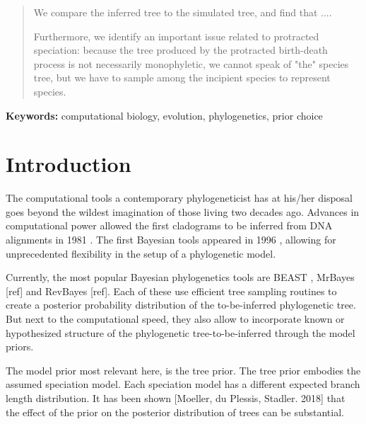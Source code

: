 \documentclass{article}
\begin{document}
\begin{abstract}
  We compare the inferred tree to the simulated tree, and find that ....

  Furthermore, we identify an important issue related to protracted speciation:
  because the tree produced by the protracted birth-death process 
  is not necessarily monophyletic, we cannot speak of "the" species tree, but we
  have to sample among the incipient species to represent species. 



\end{abstract}

{\bf Keywords:} computational biology, evolution, phylogenetics, prior choice

\section{Introduction}

The computational tools a contemporary phylogeneticist has at his/her disposal
goes beyond the wildest imagination of those living two decades ago. 
Advances in computational power allowed the first cladograms to be inferred 
from DNA alignments in 1981 \cite{felsenstein1981}. The first Bayesian tools 
appeared in 1996 \cite{rannala1996}, allowing
for unprecedented flexibility in the setup of a phylogenetic model.

Currently, the most popular Bayesian phylogenetics tools are BEAST \cite{beast},  
MrBayes [ref] and RevBayes [ref]. Each of these use efficient tree sampling 
routines to create a posterior probability distribution of the to-be-inferred 
phylogenetic tree. But next to the computational speed, they also allow
to incorporate known or hypothesized structure of the phylogenetic 
tree-to-be-inferred through the model priors.

The model prior most relevant here, is the tree prior. The tree prior
embodies the assumed speciation model. Each speciation model has a
different expected branch length distribution. It has been shown 
[Moeller, du Plessis, Stadler. 2018] that the effect of the prior on the posterior distribution 
of trees can be substantial. 
\end{document}
